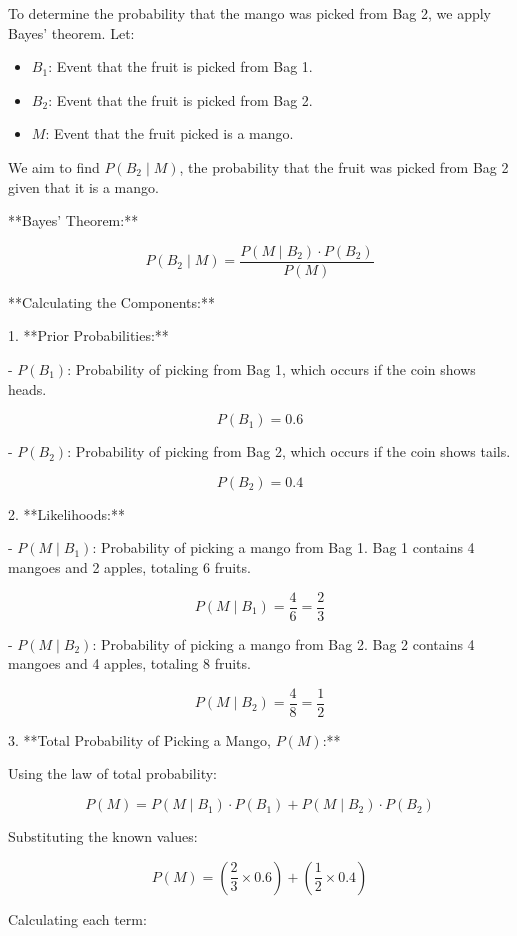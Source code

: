 \documentclass[12pt]{article}
\begin{document}
To determine the probability that the mango was picked from Bag 2, we apply Bayes' theorem. Let:

\begin{itemize}
    \item \( B_1 \): Event that the fruit is picked from Bag 1.
    \item \( B_2 \): Event that the fruit is picked from Bag 2.
    \item \( M \): Event that the fruit picked is a mango.
\end{itemize}

We aim to find \( P(B_2 \mid M) \), the probability that the fruit was picked from Bag 2 given that it is a mango.

**Bayes' Theorem:**

\[
P(B_2 \mid M) = \frac{P(M \mid B_2) \cdot P(B_2)}{P(M)}
\]

**Calculating the Components:**

1. **Prior Probabilities:**

   - \( P(B_1) \): Probability of picking from Bag 1, which occurs if the coin shows heads.

     \[
     P(B_1) = 0.6
     \]

   - \( P(B_2) \): Probability of picking from Bag 2, which occurs if the coin shows tails.

     \[
     P(B_2) = 0.4
     \]

2. **Likelihoods:**

   - \( P(M \mid B_1) \): Probability of picking a mango from Bag 1. Bag 1 contains 4 mangoes and 2 apples, totaling 6 fruits.

     \[
     P(M \mid B_1) = \frac{4}{6} = \frac{2}{3}
     \]

   - \( P(M \mid B_2) \): Probability of picking a mango from Bag 2. Bag 2 contains 4 mangoes and 4 apples, totaling 8 fruits.

     \[
     P(M \mid B_2) = \frac{4}{8} = \frac{1}{2}
     \]

3. **Total Probability of Picking a Mango, \( P(M) \):**

   Using the law of total probability:

   \[
   P(M) = P(M \mid B_1) \cdot P(B_1) + P(M \mid B_2) \cdot P(B_2)
   \]

   Substituting the known values:

   \[
   P(M) = \left( \frac{2}{3} \times 0.6 \right) + \left( \frac{1}{2} \times 0.4 \right)
   \]

   Calculating each term:
\end{document}
